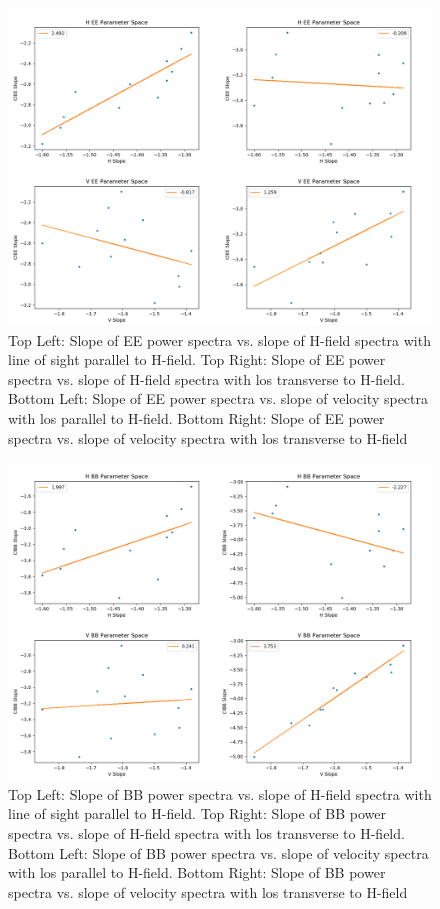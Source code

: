 \begin{figure}[h]
\includegraphics[width=\linewidth]{ee_V_H_x_y_paramspace.png}
\caption{Top Left: Slope of EE power spectra vs. slope of H-field spectra with
line of sight parallel to H-field. Top Right: Slope of EE power spectra vs. slope of H-field spectra with los transverse to H-field. Bottom Left: Slope of EE power spectra vs. slope of
velocity spectra with los parallel to H-field. Bottom Right: Slope of EE power spectra vs.
slope of velocity spectra with los transverse to H-field}
\label{fig:ee_V_H}
\end{figure}

\begin{figure}[h]
\includegraphics[width=\linewidth]{bb_V_H_x_y_paramspace.png}
\caption{Top Left: Slope of BB power spectra vs. slope of H-field spectra with
line of sight parallel to H-field. Top Right: Slope of BB power spectra vs.
slope of H-field spectra with los transverse to H-field. Bottom Left: Slope of
BB power spectra vs. slope of velocity spectra with los parallel to H-field.
Bottom Right: Slope of BB power spectra vs. slope of velocity spectra with los transverse to H-field}
\label{fig:bb_V_H}
\end{figure}

